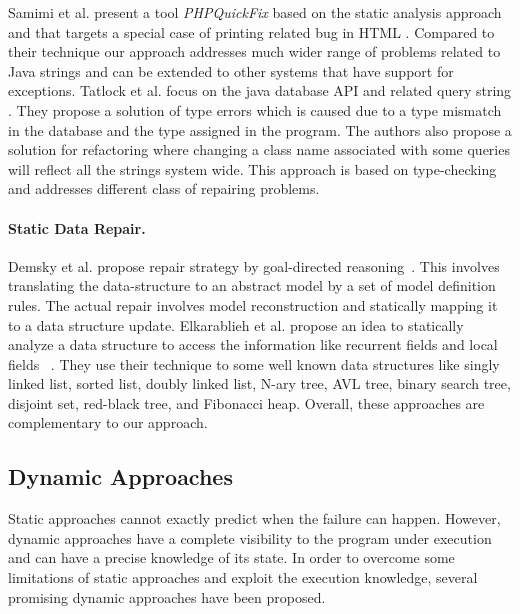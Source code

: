 Samimi et al. present a tool \textit{PHPQuickFix} based on the static analysis approach and that
targets a special case of printing related bug in HTML \cite{SamirniSAMTH12}. Compared to their technique our
approach addresses much wider range of problems related to Java strings and can be extended to
other systems that have support for exceptions.
Tatlock et al. focus on the java database API and related query string \cite{Tatlock:2008}. They
propose a solution of type errors which is caused due to a type mismatch in
the database and the type assigned in the program. The authors also propose a
solution for refactoring where changing a class name associated with some
queries will reflect all the strings system wide. This approach is based on type-checking
and addresses different class of repairing problems.

\paragraph{Static Data Repair.}
Demsky et al. propose repair strategy by goal-directed reasoning~\cite{conf/icse/DemskyR05}. This involves
translating the data-structure to an abstract model by a set of model definition
rules. The actual repair involves model reconstruction and statically mapping it
to a data structure update. Elkarablieh et al. propose an idea to statically analyze a data structure to
access the information like recurrent fields and local fields ~\cite{conf/oopsla/2007}. They use their
technique to some well known data structures like singly linked list, sorted
list, doubly linked list, N-ary tree, AVL tree, binary search tree, disjoint set,
red-black tree, and Fibonacci heap. Overall, these approaches are complementary to
our approach. 

\subsection{Dynamic Approaches}
Static approaches cannot exactly predict when the failure can happen. However,
dynamic approaches have a complete visibility to the program under execution and can
have a precise knowledge of its state. In order to overcome some limitations of static approaches
and exploit the execution knowledge, several promising dynamic approaches have
been proposed.
